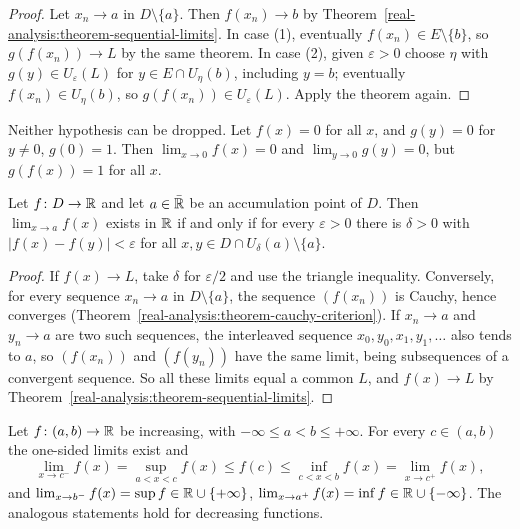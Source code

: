 \begin{proof}
Let $x_n \to a$ in $D \setminus \{a\}$. Then $f(x_n) \to b$ by Theorem~\ref{real-analysis:theorem-sequential-limits}. In case (1), eventually $f(x_n) \in E \setminus \{b\}$, so $g(f(x_n)) \to L$ by the same theorem. In
case (2), given $\varepsilon > 0$ choose $\eta$ with $g(y) \in U_\varepsilon(L)$ for $y \in E \cap U_\eta(b)$, including $y = b$; eventually $f(x_n) \in U_\eta(b)$, so $g(f(x_n)) \in U_\varepsilon(L)$. Apply the theorem again.
\end{proof}

\begin{counterexample}\label{real-analysis:counterexample-composite}
Neither hypothesis can be dropped. Let $f(x) = 0$ for all $x$, and $g(y) = 0$ for $y \neq 0$, $g(0) = 1$. Then $\lim_{x \to 0}f(x) = 0$ and $\lim_{y \to 0}g(y) = 0$, but $g(f(x)) = 1$ for all $x$.
\end{counterexample}

\begin{proposition}\label{real-analysis:proposition-cauchy-functions}
Let $f \colon D \to \mathbb{R}$ and let $a \in \bar{\mathbb{R}}$ be an accumulation point of $D$. Then $\lim_{x \to a}f(x)$ exists in $\mathbb{R}$ if and only if for every $\varepsilon > 0$ there is $\delta > 0$ with
$|f(x) - f(y)| < \varepsilon$ for all $x, y \in D \cap U_\delta(a) \setminus \{a\}$.
\end{proposition}

\begin{proof}
If $f(x) \to L$, take $\delta$ for $\varepsilon/2$ and use the triangle inequality. Conversely, for every sequence $x_n \to a$ in $D \setminus \{a\}$, the sequence $(f(x_n))$ is Cauchy, hence converges
(Theorem~\ref{real-analysis:theorem-cauchy-criterion}). If $x_n \to a$ and $y_n \to a$ are two such sequences, the interleaved sequence $x_0, y_0, x_1, y_1, \ldots$ also tends to $a$, so $(f(x_n))$ and $(f(y_n))$ have the
same limit, being subsequences of a convergent sequence. So all these limits equal a common $L$, and $f(x) \to L$ by Theorem~\ref{real-analysis:theorem-sequential-limits}.
\end{proof}

\begin{proposition}\label{real-analysis:proposition-monotone-limits}
Let $f \colon (a, b) \to \mathbb{R}$ be increasing, with $-\infty \leq a < b \leq +\infty$. For every $c \in (a, b)$ the one-sided limits exist and
\[
\lim_{x \to c^-}f(x) = \sup_{a < x < c}f(x) \leq f(c) \leq \inf_{c < x < b}f(x) = \lim_{x \to c^+}f(x),
\]
and $\lim_{x \to b^-}f(x) = \sup f \in \mathbb{R} \cup \{+\infty\}$, $\lim_{x \to a^+}f(x) = \inf f \in \mathbb{R} \cup \{-\infty\}$. The analogous statements hold for decreasing functions.
\end{proposition}

